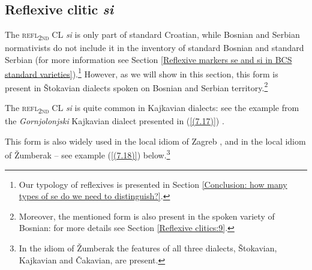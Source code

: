 \subsection{Reflexive clitic \textit{si}}
\label{Reflexive clitic si}

The \textsc{refl\textsubscript{2nd}} CL \textit{si} is only part of standard Croatian, while Bosnian and Serbian normativists do not include it in the inventory of standard Bosnian and standard Serbian (for more information see Section \ref{Reflexive markers se and si in BCS standard varieties}).\footnote{Our typology of reflexives is presented in Section \ref{Conclusion: how many types of se do we need to distinguish?}.} However, as we will show in this section, this form is present in Štokavian dialects spoken on Bosnian and Serbian territory.\footnote{Moreover, the mentioned form is also present in the spoken variety of Bosnian: for more details see Section \ref{Reflexive clitics:9}.}

The \textsc{refl\textsubscript{2nd}} CL \textit{si} is quite common in Kajkavian dialects: see the example from the \textit{Gornjolonjski} Kajkavian dialect presented in (\ref{(7.17)}) \citep[cf.][242]{BrlobasLoncaric12}.


\noindent This form is also widely used in the local idiom of Zagreb \citep[65]{Hoyt12}, and in the local idiom of Žumberak \citep[cf.][25]{Tezak85} – see example (\ref{(7.18)}) below.\footnote{In the idiom of Žumberak the features of all three dialects, Štokavian, Kajkavian and Čakavian, are present.} 



